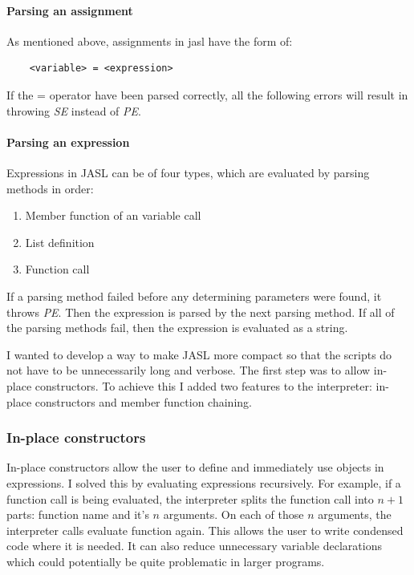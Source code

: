 \documentclass{ctuthesis}
\begin{document}
\paragraph{Parsing an assignment}
As mentioned above, assignments in jasl have the form of:
\begin{verbatim}
	<variable> = <expression>
\end{verbatim}

If the = operator have been parsed correctly, all the following errors will result in throwing \textit{SE} instead of \textit{PE}.  

\paragraph{Parsing an expression}
Expressions in JASL can be of four types, which are evaluated by parsing methods in order:
\begin{enumerate}
	\item Member function of an variable call
	\item List definition
	\item Function call
\end{enumerate}

If a parsing method failed before any determining parameters were found, it throws \textit{PE}. Then the expression is parsed by the next parsing method. If all of the parsing methods fail, then the expression is evaluated as a string. 

I wanted to develop a way to make JASL more compact so that the scripts do not have to be unnecessarily long and verbose. The first step was to allow in-place constructors. To achieve this I added two features to the interpreter: in-place constructors and member function chaining.

\subsubsection{In-place constructors}
In-place constructors allow the user to define and immediately use objects in expressions. I solved this by evaluating expressions recursively. For example, if a function call is being evaluated, the interpreter splits the function call into $n+1$ parts: function name and it's $n$ arguments. On each of those $n$ arguments, the interpreter calls evaluate function again. This allows the user to write condensed code where it is needed. It can also reduce unnecessary variable declarations which could potentially be quite problematic in larger programs.
\end{document}

